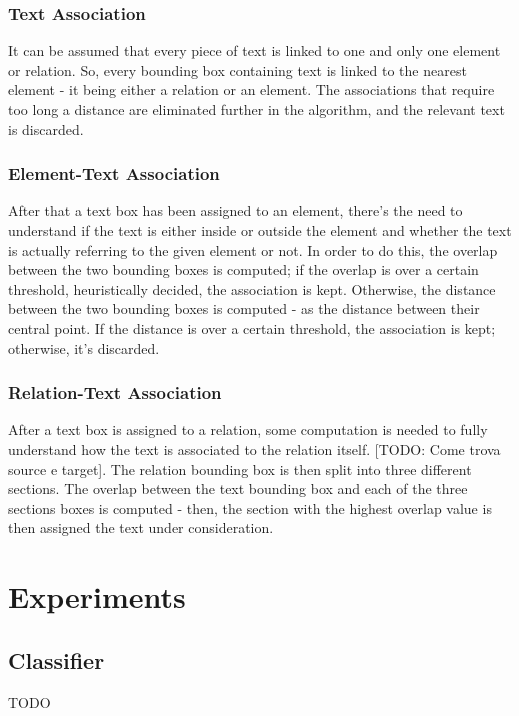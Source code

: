 \documentclass[conference]{IEEEtran}
\begin{document}
\subsubsection{Text Association}
It can be assumed that every piece of text is linked to one and only one element or relation. So, every bounding box containing text is linked to the nearest element - it being either a relation or an element. The associations that require too long a distance are eliminated further in the algorithm, and the relevant text is discarded.\\

\subsubsection{Element-Text Association}
After that a text box has been assigned to an element, there's the need to understand if the text is either inside or outside the element and whether the text is actually referring to the given element or not. In order to do this, the overlap between the two bounding boxes is computed; if the overlap is over a certain threshold, heuristically decided, the association is kept. Otherwise, the distance between the two bounding boxes is computed - as the distance between their central point. If the distance is over a certain threshold, the association is kept; otherwise, it's discarded.\\

\subsubsection{Relation-Text Association}
After a text box is assigned to a relation, some computation is needed to fully understand how the text is associated to the relation itself. [TODO: Come trova source e target]. The relation bounding box is then split into three different sections. The overlap between the text bounding box and each of the three sections boxes is computed - then, the section with the highest overlap value is then assigned the text under consideration.

\section{Experiments}

\subsection{Classifier}
TODO
\end{document}
